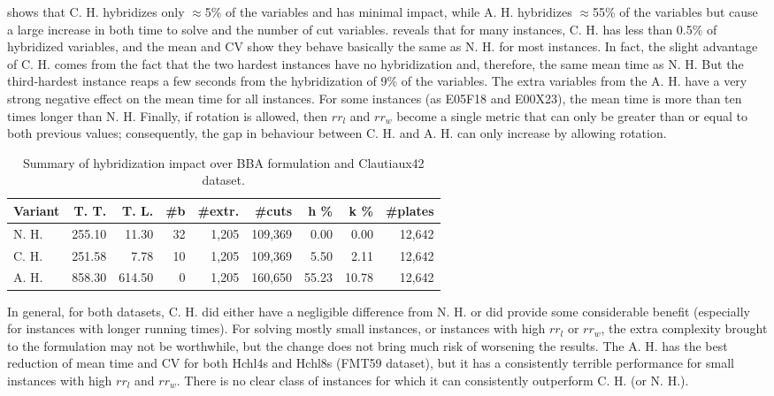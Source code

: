\documentclass[ppgc,tese,english,formais,babel]{iiufrgs}
\begin{document}
 shows that C. H. hybridizes only \(\approx\)5\% of the variables and has minimal impact, while A. H. hybridizes \(\approx\)55\% of the variables but cause a large increase in both time to solve and the number of cut variables.
 reveals that for many instances, C. H. has less than 0.5\% of hybridized variables, and the mean and CV show they behave basically the same as N. H. for most instances.
In fact, the slight advantage of C. H. comes from the fact that the two hardest instances have no hybridization and, therefore, the same mean time as N. H.
But the third-hardest instance reaps a few seconds from the hybridization of 9\% of the variables.
The extra variables from the A. H. have a very strong negative effect on the mean time for all instances.
For some instances (as E05F18 and E00X23), the mean time is more than ten times longer than N. H.
Finally, if rotation is allowed, then \(rr_l\) and \(rr_w\) become a single metric that can only be greater than or equal to both previous values; consequently, the gap in behaviour between C. H. and A. H. can only increase by allowing rotation.

\begin{table}
\caption{Summary of hybridization impact over BBA formulation and Clautiaux42 dataset.}
\label{tab:g2opp_hyb_summary}
\begin{center}
\begin{tabular}{lrrrrrrrr}
\hline\hline
\textbf{Variant} & \textbf{T. T.} & \textbf{T. L.} & \textbf{\#b} & \textbf{\#extr.} &\textbf{\#cuts} & \textbf{h \%} & \textbf{k \%} & \textbf{\#plates} \\\hline
N. H. & 255.10 & 11.30 & 32 & 1,205 & 109,369 & 0.00 & 0.00 & 12,642 \\
C. H. & 251.58 & 7.78 & 10 & 1,205 & 109,369 & 5.50 & 2.11 & 12,642 \\
A. H. & 858.30 & 614.50 & 0 & 1,205 & 160,650 & 55.23 & 10.78 & 12,642 \\\hline\hline
\end{tabular}
\end{center}
\end{table}

In general, for both datasets, C. H. did either have a negligible difference from N. H. or did provide some considerable benefit (especially for instances with longer running times).
For solving mostly small instances, or instances with high \(rr_l\) or \(rr_w\), the extra complexity brought to the formulation may not be worthwhile, but the change does not bring much risk of worsening the results.
The A. H. has the best reduction of mean time and CV for both Hchl4s and Hchl8s (FMT59 dataset), but it has a consistently terrible performance for small instances with high \(rr_l\) and \(rr_w\).
There is no clear class of instances for which it can consistently outperform C. H. (or N. H.).
\end{document}
